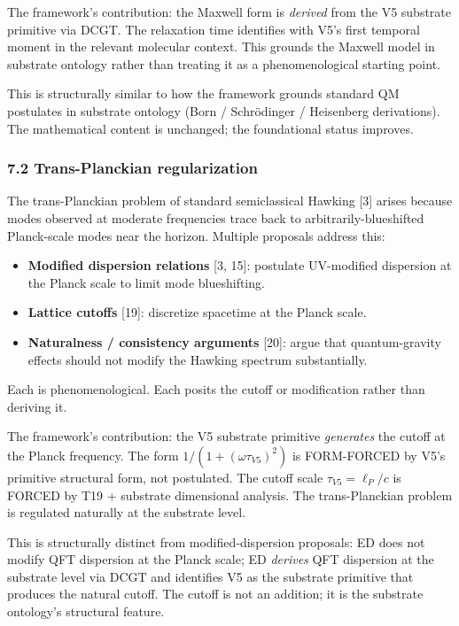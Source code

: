 \documentclass[
  11pt,
  a4paperpaper,
]{article}
\providecommand{\tightlist}{%
  \setlength{\itemsep}{0pt}\setlength{\parskip}{0pt}}
\begin{document}
The framework's contribution: the Maxwell form is \emph{derived} from
the V5 substrate primitive via DCGT. The relaxation time identifies with
V5's first temporal moment in the relevant molecular context. This
grounds the Maxwell model in substrate ontology rather than treating it
as a phenomenological starting point.

This is structurally similar to how the framework grounds standard QM
postulates in substrate ontology (Born / Schrödinger / Heisenberg
derivations). The mathematical content is unchanged; the foundational
status improves.

\subsubsection{7.2 Trans-Planckian
regularization}\label{trans-planckian-regularization}

The trans-Planckian problem of standard semiclassical Hawking {[}3{]}
arises because modes observed at moderate frequencies trace back to
arbitrarily-blueshifted Planck-scale modes near the horizon. Multiple
proposals address this:

\begin{itemize}
\tightlist
\item
  \textbf{Modified dispersion relations} {[}3, 15{]}: postulate
  UV-modified dispersion at the Planck scale to limit mode blueshifting.
\item
  \textbf{Lattice cutoffs} {[}19{]}: discretize spacetime at the Planck
  scale.
\item
  \textbf{Naturalness / consistency arguments} {[}20{]}: argue that
  quantum-gravity effects should not modify the Hawking spectrum
  substantially.
\end{itemize}

Each is phenomenological. Each posits the cutoff or modification rather
than deriving it.

The framework's contribution: the V5 substrate primitive
\emph{generates} the cutoff at the Planck frequency. The form
\(1/(1+(\omega\tau_{V5})^2)\) is FORM-FORCED by V5's primitive
structural form, not postulated. The cutoff scale
\(\tau_{V5} = \ell_P/c\) is FORCED by T19 + substrate dimensional
analysis. The trans-Planckian problem is regulated naturally at the
substrate level.

This is structurally distinct from modified-dispersion proposals: ED
does not modify QFT dispersion at the Planck scale; ED \emph{derives}
QFT dispersion at the substrate level via DCGT and identifies V5 as the
substrate primitive that produces the natural cutoff. The cutoff is not
an addition; it is the substrate ontology's structural feature.
\end{document}
